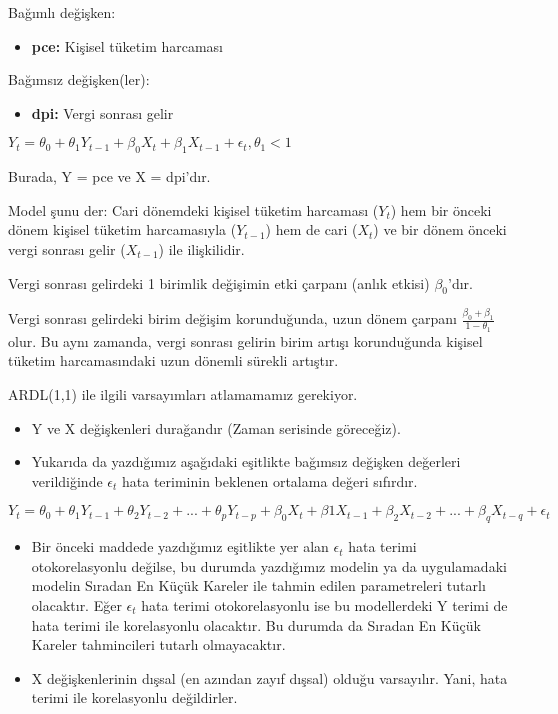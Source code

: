 \documentclass[
]{book}
\providecommand{\tightlist}{%
  \setlength{\itemsep}{0pt}\setlength{\parskip}{0pt}}
\begin{document}
Bağımlı değişken:

\begin{itemize}
\tightlist
\item
  \textbf{pce:} Kişisel tüketim harcaması
\end{itemize}

Bağımsız değişken(ler):

\begin{itemize}
\tightlist
\item
  \textbf{dpi:} Vergi sonrası gelir
\end{itemize}

\(Y_t = \theta_0 + \theta_1Y_{t-1} + \beta_0X_t + \beta_1X_{t-1} + \epsilon_t, \theta_1 < 1\)

Burada, Y = pce ve X = dpi'dır.

Model şunu der: Cari dönemdeki kişisel tüketim harcaması (\(Y_t\)) hem bir önceki dönem kişisel tüketim harcamasıyla (\(Y_{t-1}\)) hem de cari (\(X_t\)) ve bir dönem önceki vergi sonrası gelir (\(X_{t-1}\)) ile ilişkilidir.

Vergi sonrası gelirdeki 1 birimlik değişimin etki çarpanı (anlık etkisi) \(\beta_0\)'dır.

Vergi sonrası gelirdeki birim değişim korunduğunda, uzun dönem çarpanı \(\frac{\beta_0 + \beta_1}{1 - \theta_1}\) olur. Bu aynı zamanda, vergi sonrası gelirin birim artışı korunduğunda kişisel tüketim harcamasındaki uzun dönemli sürekli artıştır.

ARDL(1,1) ile ilgili varsayımları atlamamamız gerekiyor.

\begin{itemize}
\item
  Y ve X değişkenleri durağandır (Zaman serisinde göreceğiz).
\item
  Yukarıda da yazdığımız aşağıdaki eşitlikte bağımsız değişken değerleri verildiğinde \(\epsilon_t\) hata teriminin beklenen ortalama değeri sıfırdır.
\end{itemize}

\(Y_t = \theta_0 + \theta_1Y_{t-1} + \theta_2Y_{t-2} + ... + \theta_pY_{t-p} + \beta_0X_t + \beta1X_{t-1} + \beta_2X_{t-2} + ... + \beta_qX_{t-q} + \epsilon_t\)

\begin{itemize}
\item
  Bir önceki maddede yazdığımız eşitlikte yer alan \(\epsilon_t\) hata terimi otokorelasyonlu değilse, bu durumda yazdığımız modelin ya da uygulamadaki modelin Sıradan En Küçük Kareler ile tahmin edilen parametreleri tutarlı olacaktır. Eğer \(\epsilon_t\) hata terimi otokorelasyonlu ise bu modellerdeki Y terimi de hata terimi ile korelasyonlu olacaktır. Bu durumda da Sıradan En Küçük Kareler tahmincileri tutarlı olmayacaktır.
\item
  X değişkenlerinin dışsal (en azından zayıf dışsal) olduğu varsayılır. Yani, hata terimi ile korelasyonlu değildirler.
\end{itemize}
\end{document}
